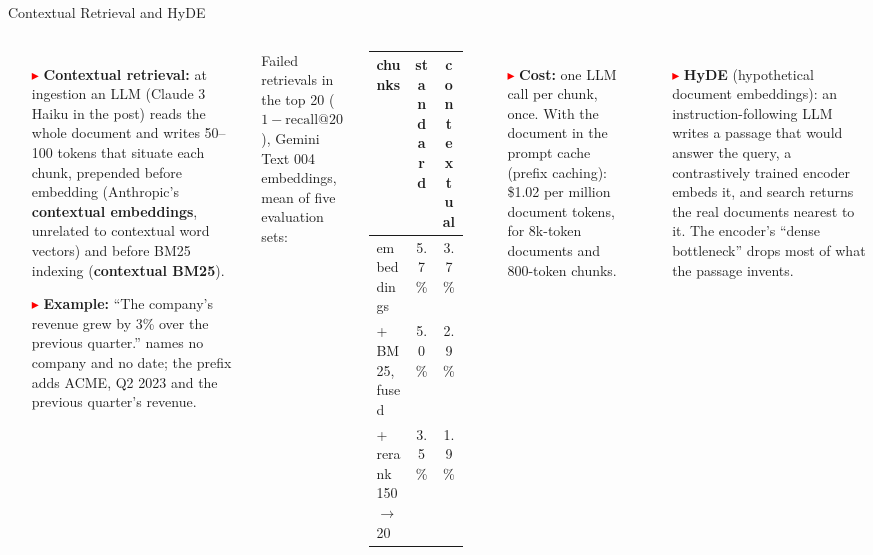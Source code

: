 \begin{frame}{Contextual Retrieval and HyDE}
  \begin{columns}[T,onlytextwidth]
      \begin{itemize}\scriptsize\itemsep0.3em
        \item[\textcolor{red}{$\blacktriangleright$}] \textbf{Contextual retrieval:} at ingestion an LLM (Claude 3 Haiku in the post) reads the whole document and writes 50--100 tokens that situate each chunk, prepended before embedding (Anthropic's \textbf{contextual embeddings}, unrelated to contextual word vectors) and before BM25 indexing (\textbf{contextual BM25}).
        \item[\textcolor{red}{$\blacktriangleright$}] \textbf{Example:} ``The company's revenue grew by 3\% over the previous quarter.'' names no company and no date; the prefix adds ACME, Q2 2023 and the previous quarter's revenue.
      \end{itemize}
      \vspace{0.2em}
      {\centering\scriptsize Failed retrievals in the top 20 ($1 - \text{recall@20}$), Gemini Text 004 embeddings, mean of five evaluation sets:\\[0.15em]
      \begin{tabular}{lcc}
        \toprule
        chunks & standard & contextual \\
        \midrule
        embeddings & 5.7\% & 3.7\% \\
        + BM25, fused & 5.0\% & 2.9\% \\
        + rerank 150 $\to$ 20 & 3.5\% & 1.9\% \\
        \bottomrule
      \end{tabular}\par}
      \vspace{0.2em}
      \begin{itemize}\scriptsize
        \item[\textcolor{red}{$\blacktriangleright$}] \textbf{Cost:} one LLM call per chunk, once. With the document in the prompt cache (prefix caching): \$1.02 per million document tokens, for 8k-token documents and 800-token chunks.
      \end{itemize}
      \begin{itemize}\scriptsize
        \item[\textcolor{red}{$\blacktriangleright$}] \textbf{HyDE} (hypothetical document embeddings): an instruction-following LLM writes a passage that would answer the query, a contrastively trained encoder embeds it, and search returns the real documents nearest to it. The encoder's ``dense bottleneck'' drops most of what the passage invents.

\end{itemize}
\end{columns}
\end{frame}
